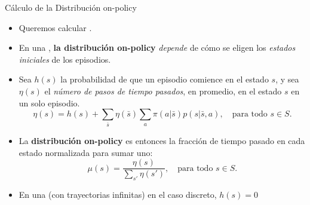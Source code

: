 \documentclass[10pt, envcountsect, handout, aspectratio=1610, hyperref={hypertexnames=true}]{beamer}
\begin{document}

\begin{frame}{Cálculo de la Distribución on-policy}
	
	\begin{itemize}
		\item Queremos calcular .
		\item En una , \textbf{la distribución on-policy}  \textit{depende} de cómo se eligen los \textit{estados iniciales} de los episodios.
		\item Sea $h(s)$ la probabilidad de que un episodio comience en el estado $s$, y sea $\eta(s)$ el \textit{número de pasos de tiempo pasados}, en promedio, en el estado $s$ en un solo episodio.
		\[
		\eta(s) = h(s) + \sum_{\bar{s}} \eta(\bar{s}) \sum_a \pi(a|\bar{s})p(s|\bar{s}, a), \quad \text{para todo } s \in S.
		\]
		\item La \textbf{distribución on-policy} es entonces la fracción de tiempo pasado en cada estado normalizada para sumar uno:
		\[
		\mu(s) = \frac{\eta(s)}{\sum_{s'} \eta(s')}, \quad \text{para todo } s \in S.
		\]
		
		\item En una  (con trayectorias infinitas) en el caso discreto, $h(s)=0$
	\end{itemize}
\end{frame}
\end{document}

